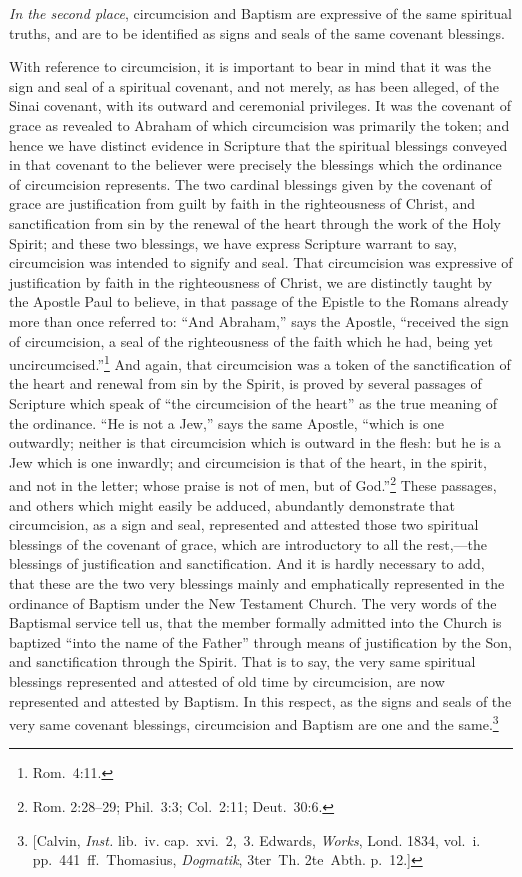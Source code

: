\documentclass[
]{book}
\begin{document}
\emph{In the second place}, circumcision and Baptism are expressive of the same spiritual truths, and are to be identified as signs and seals of the same covenant blessings.

With reference to circumcision, it is important to bear in mind that it was the sign and seal of a spiritual covenant, and not merely, as has been alleged, of the Sinai covenant, with its outward and ceremonial privileges. It was the covenant of grace as revealed to Abraham of which circumcision was primarily the token; and hence we have distinct evidence in Scripture that the spiritual blessings conveyed in that covenant to the believer were precisely the blessings which the ordinance of circumcision represents. The two cardinal blessings given by the covenant of grace are justification from guilt by faith in the righteousness of Christ, and sanctification from sin by the renewal of the heart through the work of the Holy Spirit; and these two blessings, we have express Scripture warrant to say, circumcision was intended to signify and seal. That circumcision was expressive of justification by faith in the righteousness of Christ, we are distinctly taught by the Apostle Paul to believe, in that passage of the Epistle to the Romans already more than once referred to: ``And Abraham,'' says the Apostle, ``received the sign of circumcision, a seal of the righteousness of the faith which he had, being yet uncircumcised.''\footnote{Rom.~4:11.} And again, that circumcision was a token of the sanctification of the heart and renewal from sin by the Spirit, is proved by several passages of Scripture which speak of ``the circumcision of the heart'' as the true meaning of the ordinance. ``He is not a Jew,'' says the same Apostle, ``which is one outwardly; neither is that circumcision which is outward in the flesh: but he is a Jew which is one inwardly; and circumcision is that of the heart, in the spirit, and not in the letter; whose praise is not of men, but of God.''\footnote{Rom. 2:28--29; Phil.~3:3; Col.~2:11; Deut.~30:6.} These passages, and others which might easily be adduced, abundantly demonstrate that circumcision, as a sign and seal, represented and attested those two spiritual blessings of the covenant of grace, which are introductory to all the rest,---the blessings of justification and sanctification. And it is hardly necessary to add, that these are the two very blessings mainly and emphatically represented in the ordinance of Baptism under the New Testament Church. The very words of the Baptismal service tell us, that the member formally admitted into the Church is baptized ``into the name of the Father'' through means of justification by the Son, and sanctification through the Spirit. That is to say, the very same spiritual blessings represented and attested of old time by circumcision, are now represented and attested by Baptism. In this respect, as the signs and seals of the very same covenant blessings, circumcision and Baptism are one and the same.\footnote{{[}Calvin, \emph{Inst.} lib.~iv. cap.~xvi.~2,~3. Edwards, \emph{Works}, Lond. 1834, vol.~i. pp.~441~ff.~Thomasius, \foreignlanguage{ngerman}{\emph{Dogmatik}, 3ter~Th. 2te~Abth.} p.~12.{]}}
\end{document}
